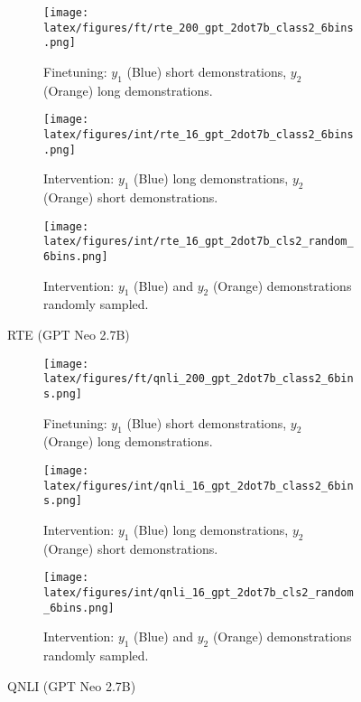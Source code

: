 \begin{figure*}[t!]
    \centering
    \begin{minipage}[t]{\linewidth}
        \begin{subfigure}{0.31\linewidth}
            \centering
            \texttt{[image: latex/figures/ft/rte\_200\_gpt\_2dot7b\_class2\_6bins.png]}
            \caption{Finetuning: $y_1$ (Blue) short demonstrations, $y_2$ (Orange) long demonstrations.}
        \end{subfigure}%
        \hfill
        \begin{subfigure}{0.31\linewidth}
            \centering
            \texttt{[image: latex/figures/int/rte\_16\_gpt\_2dot7b\_class2\_6bins.png]}
            \caption{Intervention: $y_1$ (Blue) long demonstrations, $y_2$ (Orange) short demonstrations.}
        \end{subfigure}
        \hfill
        \begin{subfigure}{0.31\linewidth}
            \centering
            \texttt{[image: latex/figures/int/rte\_16\_gpt\_2dot7b\_cls2\_random\_6bins.png]}
            \caption{Intervention: $y_1$ (Blue) and $y_2$ (Orange) demonstrations randomly sampled.}
        \end{subfigure}
    \end{minipage}%
    \hfill
    \begin{minipage}[c]{\linewidth}
        \caption{RTE (GPT Neo 2.7B)}
    \end{minipage}
\end{figure*}

\begin{figure*}[t!]
    \centering
    \begin{minipage}[t]{\linewidth}
        \begin{subfigure}{0.31\linewidth}
            \centering
            \texttt{[image: latex/figures/ft/qnli\_200\_gpt\_2dot7b\_class2\_6bins.png]}
            \caption{Finetuning: $y_1$ (Blue) short demonstrations, $y_2$ (Orange) long demonstrations.}
        \end{subfigure}%
        \hfill
        \begin{subfigure}{0.31\linewidth}
            \centering
            \texttt{[image: latex/figures/int/qnli\_16\_gpt\_2dot7b\_class2\_6bins.png]}
            \caption{Intervention: $y_1$ (Blue) long demonstrations, $y_2$ (Orange) short demonstrations.}
        \end{subfigure}
        \hfill
        \begin{subfigure}{0.31\linewidth}
            \centering
            \texttt{[image: latex/figures/int/qnli\_16\_gpt\_2dot7b\_cls2\_random\_6bins.png]}
            \caption{Intervention: $y_1$ (Blue) and $y_2$ (Orange) demonstrations randomly sampled.}
        \end{subfigure}
    \end{minipage}%
    \hfill
    \begin{minipage}[c]{\linewidth}
        \caption{QNLI (GPT Neo 2.7B)}
    \end{minipage}
\end{figure*}

